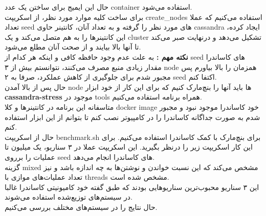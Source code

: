 حال این ایمیج برای ساختن یک عدد 
container 
استفاده می‌شود.
\\
برای ساخت کلیه موارد مورد نظر، از اسکریپت create\_nodes استفاده می‌کنیم که عملا تعداد seed های مورد نظر را 
گرفته و به تعداد آنان، کانتینر حاوی 
cassandra 
ایجاد کرده، 
این کانتینرها را به هم متصل می‌کند و یک 
cluster 
تشکیل می‌دهد و درنهایت 
صبر می‌کند تا آنها بالا بیایند و از صحت آنان مطلع می‌شود.
\\
\textbf{نکته مهم : } 
به علت عدم وجود حافظه کافی و اینکه هر کدام از 
seed 
های کاساندرا مقدار زیادی منبع مصرف می‌کنند، نتوانستم بیش از ۳ 
node 
همزمان را بالا بیاورم پس مجبور شدم برای جلوگیری از کاهش عملکرد، صرفا به ۲ seed 
اکتفا کنم.
\\
حال پس از بالا آمدن node 
ها باید آنها را بنچ‌مارک کنیم که برای این کار از خود ابزار 
\textbf{cassandra-stress}
موجود در tools 
همراه برنامه استفاده می‌کنیم.
\\
متاسفانه این برنامه در کانتینرها و کلا docker image 
خود کاساندرا موجود نبود و مجبور شدم به صورت جداگانه کاساندرا را در کامپیوتر نصب کنم تا بتوانم از این ابزار استفاده کنم.\\
حال از اسکریپت benchmark.sh 
برای بنچ‌مارک با کمک کاساندرا استفاده می‌کنیم.
برای این کار اسکریپت زیر را درنظر بگیرید.
این اسکریپت عملا در ۳ سناریو، یک میلیون تا عملیات را برروی 
seed 
های کاساندرا انجام می‌دهد.
\\
گزینه mixed مشخص می‌کند که این 
نسبت خواندن و نوشتن‌ها به چه اندازه باشد و نیز 
تعداد عملیات‌های موازی با 
threads 
مشخص شده است.
\\
این ۳ سناریو محبوب‌ترین سناریوهایی بودند که طبق گفته خود 
کامیونیتی کاساندرا 
غالبا در سیستم‌های توزیع‌شده استفاده می‌شوند.
\\
حال نتایج را در سیستم‌های مختلف بررسی می‌کنیم.
